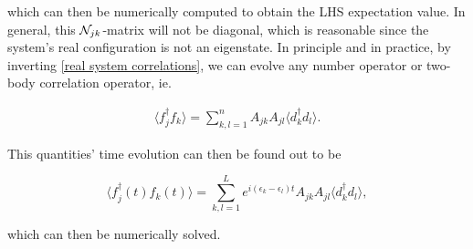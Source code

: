 \documentclass{homework}
\begin{document}
which can then be numerically computed to obtain the LHS expectation value. In general, this $\mathcal{N}_{jk}$-matrix will not be diagonal, which is reasonable since the system's real configuration is not an eigenstate. In principle and in practice, by inverting \eqref{real system correlations}, we can evolve any number operator or two-body correlation operator, ie.

\begin{align}
    \langle f_j^\dagger f_k \rangle = \sum_{k,l =1}^{n} A_{jk} A_{jl} \langle d_k^\dagger d_l \rangle.
\end{align}

This quantities' time evolution can then be found out to be 

\begin{equation}
    \langle f_j^\dagger(t) f_k(t) \rangle = \sum_{k,l =1}^{L} e^{i(\epsilon_k - \epsilon_l)t}A_{jk} A_{jl} \langle d_k^\dagger d_l \rangle,
\end{equation}

which can then be numerically solved. 
\end{document}
